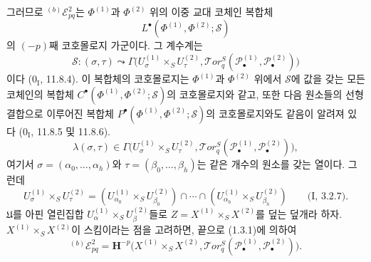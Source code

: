 \begin{env}[6.6.4]
그러므로 ${}^{(b)}\mathscr E_{pq}^2$는
$\Phi^{(1)}$과 $\Phi^{(2)}$ 위의 이중 교대 코체인 복합체
\[
  L^\bullet(\Phi^{(1)},\Phi^{(2)};\mathscr S)
\]
의 $(-p)$째 코호몰로지 가군이다. 그 계수계는
\[
  \mathscr S:(\sigma,\tau)\leadsto
  \Gamma\bigl(U_\sigma^{(1)}\times_S U_\tau^{(2)},
    \mathscr{T}\!or_q^S
    (\mathscr P_\bullet^{(1)},\mathscr P_\bullet^{(2)})\bigr)
\]
이다 ($0_{\mathrm I}$, 11.8.4). 이 복합체의 코호몰로지는
$\Phi^{(1)}$과 $\Phi^{(2)}$ 위에서 $\mathscr S$에 값을 갖는 모든
코체인의 복합체
$C^\bullet(\Phi^{(1)},\Phi^{(2)};\mathscr S)$의 코호몰로지와 같고,
또한 다음 원소들의 선형결합으로 이루어진 복합체
$P^\bullet(\Phi^{(1)},\Phi^{(2)};\mathscr S)$의 코호몰로지와도 같음이
알려져 있다 ($0_{\mathrm I}$, 11.8.5 및 11.8.6).
\[
  \lambda(\sigma,\tau)\in
  \Gamma\bigl(U_\sigma^{(1)}\times_S U_\tau^{(2)},
    \mathscr{T}\!or_q^S
    (\mathscr P_\bullet^{(1)},\mathscr P_\bullet^{(2)})\bigr),
\]
여기서 $\sigma=(\alpha_0,\ldots,\alpha_h)$와
$\tau=(\beta_0,\ldots,\beta_h)$는 같은 개수의 원소를 갖는 열이다.
그런데
\[
  U_\sigma^{(1)}\times_S U_\tau^{(2)}
  =(U_{\alpha_0}^{(1)}\times_S U_{\beta_0}^{(2)})\cap\cdots\cap
    (U_{\alpha_h}^{(1)}\times_S U_{\beta_h}^{(2)})
  \qquad\text{(I, 3.2.7)}.
\]
$\mathfrak U$를 아핀 열린집합
$U_\alpha^{(1)}\times_S U_\beta^{(2)}$들로
$Z=X^{(1)}\times_S X^{(2)}$를 덮는 덮개라 하자.
$X^{(1)}\times_S X^{(2)}$이 스킴이라는 점을 고려하면, 끝으로
(1.3.1)에 의하여
\[
  {}^{(b)}\mathscr E_{pq}^2
  =\mathbf H^{-p}\bigl(X^{(1)}\times_S X^{(2)},
    \mathscr{T}\!or_q^S
    (\mathscr P_\bullet^{(1)},\mathscr P_\bullet^{(2)})\bigr).
\]


\end{env}
